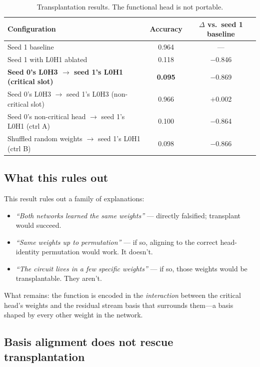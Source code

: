 \documentclass[final]{article}
\begin{document}
\begin{table}[h]
\centering
\caption{Transplantation results. The functional head is not portable.}
\label{tab:transplant}
\begin{tabular}{lcc}
\toprule
Configuration & Accuracy & $\Delta$ vs.\ seed 1 baseline \\
\midrule
Seed 1 baseline                                          & 0.964 & --- \\
Seed 1 with L0H1 ablated                                 & 0.118 & $-$0.846 \\
\textbf{Seed 0's L0H3 $\to$ seed 1's L0H1 (critical slot)} & \textbf{0.095} & $-$0.869 \\
Seed 0's L0H3 $\to$ seed 1's L0H3 (non-critical slot)   & 0.966 & $+$0.002 \\
Seed 0's non-critical head $\to$ seed 1's L0H1 (ctrl A) & 0.100 & $-$0.864 \\
Shuffled random weights $\to$ seed 1's L0H1 (ctrl B)    & 0.098 & $-$0.866 \\
\bottomrule
\end{tabular}
\end{table}

\subsection{What this rules out}

This result rules out a family of explanations:
\begin{itemize}
\item \emph{``Both networks learned the same weights''} --- directly falsified;
      transplant would succeed.
\item \emph{``Same weights up to permutation''} --- if so, aligning to the
      correct head-identity permutation would work. It doesn't.
\item \emph{``The circuit lives in a few specific weights''} --- if so, those
      weights would be transplantable. They aren't.
\end{itemize}
What remains: the function is encoded in the \emph{interaction} between the
critical head's weights and the residual stream basis that surrounds them---a
basis shaped by every other weight in the network.

\subsection{Basis alignment does not rescue transplantation}
\end{document}
